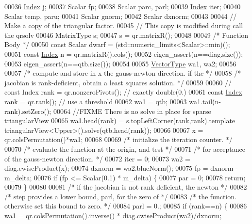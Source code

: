 \begin{DoxyCode}
00036     \hyperlink{namespace_eigen_a62e77e0933482dafde8fe197d9a2cfde}{Index} j;
00037     Scalar fp;
00038     Scalar parc, parl;
00039     \hyperlink{namespace_eigen_a62e77e0933482dafde8fe197d9a2cfde}{Index} iter;
00040     Scalar temp, paru;
00041     Scalar gnorm;
00042     Scalar dxnorm;
00043     
00044     \textcolor{comment}{// Make a copy of the triangular factor. }
00045     \textcolor{comment}{// This copy is modified during call the qrsolv}
00046     MatrixType s;
00047     s = qr.matrixR();
00048 
00049     \textcolor{comment}{/* Function Body */}
00050     \textcolor{keyword}{const} Scalar dwarf = (std::numeric\_limits<Scalar>::min)();
00051     \textcolor{keyword}{const} \hyperlink{namespace_eigen_a62e77e0933482dafde8fe197d9a2cfde}{Index} n = qr.matrixR().cols();
00052     eigen\_assert(n==diag.size());
00053     eigen\_assert(n==qtb.size());
00054 
00055     \hyperlink{struct_vector_type}{VectorType}  wa1, wa2;
00056 
00057     \textcolor{comment}{/* compute and store in x the gauss-newton direction. if the */}
00058     \textcolor{comment}{/* jacobian is rank-deficient, obtain a least squares solution. */}
00059 
00060     \textcolor{comment}{//    const Index rank = qr.nonzeroPivots(); // exactly double(0.)}
00061     \textcolor{keyword}{const} \hyperlink{namespace_eigen_a62e77e0933482dafde8fe197d9a2cfde}{Index} rank = qr.rank(); \textcolor{comment}{// use a threshold}
00062     wa1 = qtb;
00063     wa1.tail(n-rank).setZero();
00064     \textcolor{comment}{//FIXME There is no solve in place for sparse triangularView}
00065     wa1.head(rank) = s.topLeftCorner(rank,rank).template triangularView<Upper>().solve(qtb.head(rank));
00066 
00067     x = qr.colsPermutation()*wa1;
00068 
00069     \textcolor{comment}{/* initialize the iteration counter. */}
00070     \textcolor{comment}{/* evaluate the function at the origin, and test */}
00071     \textcolor{comment}{/* for acceptance of the gauss-newton direction. */}
00072     iter = 0;
00073     wa2 = diag.cwiseProduct(x);
00074     dxnorm = wa2.blueNorm();
00075     fp = dxnorm - m\_delta;
00076     \textcolor{keywordflow}{if} (fp <= Scalar(0.1) * m\_delta) \{
00077       par = 0;
00078       \textcolor{keywordflow}{return};
00079     \}
00080 
00081     \textcolor{comment}{/* if the jacobian is not rank deficient, the newton */}
00082     \textcolor{comment}{/* step provides a lower bound, parl, for the zero of */}
00083     \textcolor{comment}{/* the function. otherwise set this bound to zero. */}
00084     parl = 0.;
00085     \textcolor{keywordflow}{if} (rank==n) \{
00086       wa1 = qr.colsPermutation().inverse() *  diag.cwiseProduct(wa2)/dxnorm;

\end{DoxyCode}
